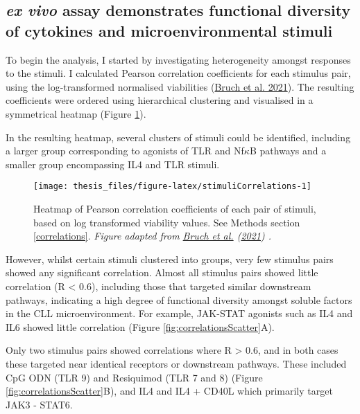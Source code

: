 \documentclass[11pt, a4paper, twosided]{book}
\begin{document}
\hypertarget{cytokine-profiling}{%
\subsection{\texorpdfstring{\emph{ex vivo} assay demonstrates functional diversity of cytokines and microenvironmental stimuli}{ex vivo assay demonstrates functional diversity of cytokines and microenvironmental stimuli}}\label{cytokine-profiling}}

To begin the analysis, I started by investigating heterogeneity amongst responses to the stimuli. I calculated Pearson correlation coefficients for each stimulus pair, using the log-transformed normalised viabilities (\protect\hyperlink{ref-Giles2021}{Bruch et al. 2021}). The resulting coefficients were ordered using hierarchical clustering and visualised in a symmetrical heatmap (Figure \ref{fig:stimuliCorrelations}).

In the resulting heatmap, several clusters of stimuli could be identified, including a larger group corresponding to agonists of TLR and Nf\(\kappa\)B pathways and a smaller group encompassing IL4 and TLR stimuli.


\begin{figure}

{\centering \texttt{[image: thesis\_files/figure-latex/stimuliCorrelations-1]} 

}

\caption{Heatmap of Pearson correlation coefficients of each pair of stimuli, based on log transformed viability values. See Methods section \ref{correlations}. \emph{Figure adapted from \protect\hyperlink{ref-Giles2021}{Bruch et al.} (\protect\hyperlink{ref-Giles2021}{2021}) .}}\label{fig:stimuliCorrelations}
\end{figure}
However, whilst certain stimuli clustered into groups, very few stimulus pairs showed any significant correlation. Almost all stimulus pairs showed little correlation (R \textless{} 0.6), including those that targeted similar downstream pathways, indicating a high degree of functional diversity amongst soluble factors in the CLL microenvironment. For example, JAK-STAT agonists such as IL4 and IL6 showed little correlation (Figure \ref{fig:correlationsScatter}A).

Only two stimulus pairs showed correlations where R \textgreater{} 0.6, and in both cases these targeted near identical receptors or downstream pathways. These included CpG ODN (TLR 9) and Resiquimod (TLR 7 and 8) (Figure \ref{fig:correlationsScatter}B), and IL4 and IL4 + CD40L which primarily target JAK3 - STAT6.
\end{document}
